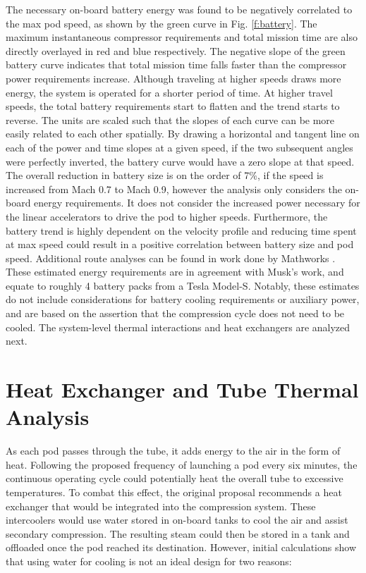 \documentclass[heading.tex]{subfiles}
\begin{document}
The necessary on-board battery energy was found to be negatively correlated to the max pod speed,
as shown by the green curve in Fig. \ref{f:battery}.
The maximum instantaneous compressor requirements and total mission time
are also directly overlayed in red and blue respectively. 
The negative slope of the green battery curve indicates that total mission time falls
faster than the compressor power requirements increase.
Although traveling at higher speeds draws more energy, the system is operated for a shorter period of time.
At higher travel speeds, the total battery requirements start to flatten and the trend starts to reverse.
The units are scaled such that the slopes of each curve can be more easily related to each other spatially.
By drawing a horizontal and tangent line on each of the power and time slopes at a given speed,
if the two subsequent angles were perfectly inverted, the battery curve would have a zero slope at that speed.
The overall reduction in battery size is on the order of 7\%, if the speed is increased from Mach 0.7 to Mach 0.9, 
however the analysis only considers the on-board energy requirements. It does not consider the increased power
necessary for the linear accelerators to drive the pod to higher speeds. 
Furthermore, the battery trend is highly dependent on the velocity profile
and reducing time spent at max speed could result in a positive correlation between battery size and pod speed.
Additional route analyses can be found in work done by Mathworks \cite{Rouleau}.
These estimated energy requirements are in agreement with Musk's work,
and equate to roughly 4 battery packs from a Tesla Model-S.
Notably, these estimates do not include considerations for battery cooling requirements or auxiliary power,
and are based on the assertion that the compression cycle does not need to be cooled.
The system-level thermal interactions and heat exchangers are analyzed next.

\section{Heat Exchanger and Tube Thermal Analysis}
\label{s:heatex}
As each pod passes through the tube, it adds energy to the air in the form of heat.
Following the proposed frequency of launching a pod every six minutes,
the continuous operating cycle could potentially heat the overall tube to excessive temperatures.
To combat this effect, the original proposal recommends a heat exchanger that would be integrated into the compression system.
These intercoolers would use water stored in on-board tanks to cool the air and assist secondary compression.
The resulting steam could then be stored in a tank and offloaded once the pod reached its destination.
However, initial calculations show that using water for cooling is not an ideal design for two reasons:
\end{document}
